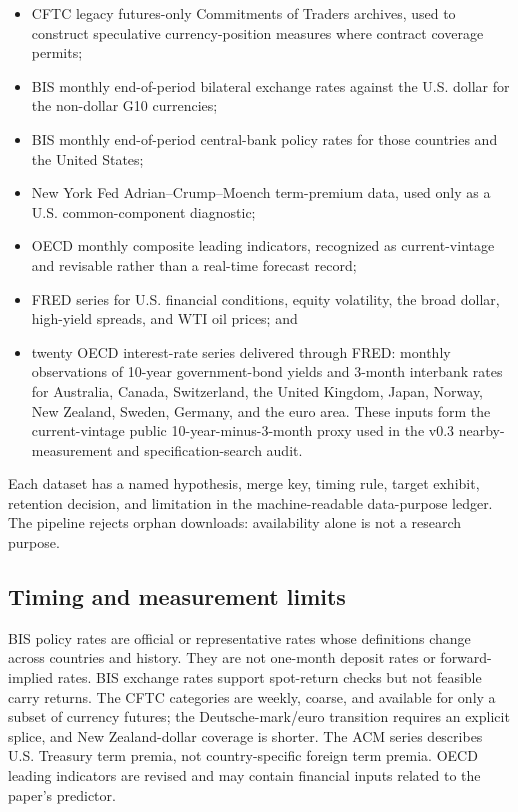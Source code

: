 \begin{itemize}
  \item CFTC legacy futures-only Commitments of Traders archives, used to construct speculative currency-position measures where contract coverage permits;
  \item BIS monthly end-of-period bilateral exchange rates against the U.S. dollar for the non-dollar G10 currencies;
  \item BIS monthly end-of-period central-bank policy rates for those countries and the United States;
  \item New York Fed Adrian--Crump--Moench term-premium data, used only as a U.S. common-component diagnostic;
  \item OECD monthly composite leading indicators, recognized as current-vintage and revisable rather than a real-time forecast record;
  \item FRED series for U.S. financial conditions, equity volatility, the broad dollar, high-yield spreads, and WTI oil prices; and
  \item twenty OECD interest-rate series delivered through FRED: monthly observations of 10-year government-bond yields and 3-month interbank rates for Australia, Canada, Switzerland, the United Kingdom, Japan, Norway, New Zealand, Sweden, Germany, and the euro area. These inputs form the current-vintage public 10-year-minus-3-month proxy used in the v0.3 nearby-measurement and specification-search audit.
\end{itemize}

Each dataset has a named hypothesis, merge key, timing rule, target exhibit, retention decision, and limitation in the machine-readable data-purpose ledger. The pipeline rejects orphan downloads: availability alone is not a research purpose.

\subsection{Timing and measurement limits}

BIS policy rates are official or representative rates whose definitions change across countries and history. They are not one-month deposit rates or forward-implied rates. BIS exchange rates support spot-return checks but not feasible carry returns. The CFTC categories are weekly, coarse, and available for only a subset of currency futures; the Deutsche-mark/euro transition requires an explicit splice, and New Zealand-dollar coverage is shorter. The ACM series describes U.S. Treasury term premia, not country-specific foreign term premia. OECD leading indicators are revised and may contain financial inputs related to the paper's predictor.

